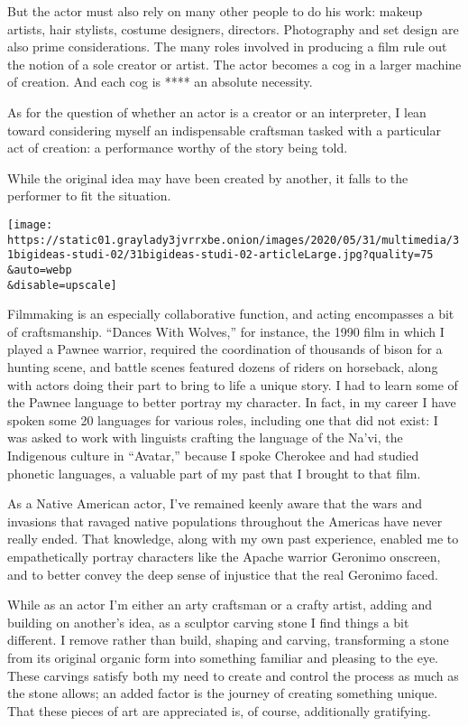 But the actor must also rely on many other people to do his work: makeup
artists, hair stylists, costume designers, directors. Photography and
set design are also prime considerations. The many roles involved in
producing a film rule out the notion of a sole creator or artist. The
actor becomes a cog in a larger machine of creation. And each cog is
**** an absolute necessity.

As for the question of whether an actor is a creator or an interpreter,
I lean toward considering myself an indispensable craftsman tasked with
a particular act of creation: a performance worthy of the story being
told.

While the original idea may have been created by another, it falls to
the performer to fit the situation.

\texttt{[image: https://static01.graylady3jvrrxbe.onion/images/2020/05/31/multimedia/31bigideas-studi-02/31bigideas-studi-02-articleLarge.jpg?quality=75\\\&auto=webp\\\&disable=upscale]}

Filmmaking is an especially collaborative function, and acting
encompasses a bit of craftsmanship. ``Dances With Wolves,'' for
instance, the 1990 film in which I played a Pawnee warrior, required the
coordination of thousands of bison for a hunting scene, and battle
scenes featured dozens of riders on horseback, along with actors doing
their part to bring to life a unique story. I had to learn some of the
Pawnee language to better portray my character. In fact, in my career I
have spoken some 20 languages for various roles, including one that did
not exist: I was asked to work with linguists crafting the language of
the Na'vi, the Indigenous culture in ``Avatar,'' because I spoke
Cherokee and had studied phonetic languages, a valuable part of my past
that I brought to that film.

As a Native American actor, I've remained keenly aware that the wars and
invasions that ravaged native populations throughout the Americas have
never really ended. That knowledge, along with my own past experience,
enabled me to empathetically portray characters like the Apache warrior
Geronimo onscreen, and to better convey the deep sense of injustice that
the real Geronimo faced.

While as an actor I'm either an arty craftsman or a crafty artist,
adding and building on another's idea, as a sculptor carving stone I
find things a bit different. I remove rather than build, shaping and
carving, transforming a stone from its original organic form into
something familiar and pleasing to the eye. These carvings satisfy both
my need to create and control the process as much as the stone allows;
an added factor is the journey of creating something unique. That these
pieces of art are appreciated is, of course, additionally gratifying.

